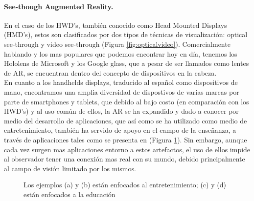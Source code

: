 \documentclass[a4paper,openright,12pt]{report}
\begin{document}
\paragraph{See-though Augmented Reality.}
En el caso de los HWD's, también conocido como Head Mounted Displays (HMD's), estos son clasificados por dos tipos de técnicas de visualización: optical see-through y video see-through (Figura \ref{fig:opticalvideo}). Comercialmente hablando y los mas populares que podemos encontrar hoy en día, tenemos los Hololens de Microsoft y los Google glass, que a pesar de ser llamados como lentes de AR, se encuentran dentro del concepto de dispositivos en la cabeza.\\
En cuanto a los handhelds displays, traducido al español como dispositivos de mano, encontramos una amplia diversidad de dispostivos de varias marcas por parte de smartphones y tablets, que debido al bajo costo (en comparación con los HWD's) y al uso común de ellos, la AR se ha expandido y dado a conocer por medio del desarrollo de aplicaciones, que así como se ha utilizado como medio de entretenimiento, también ha servido de apoyo en el campo de la enseñanza, a través de aplicaciones tales como se presenta en (Figura \ref{fig:ARejemplos}). Sin embargo, aunque cada vez surgen mas aplicaciones entorno a estos artefactos, el uso de ellos impide al observador tener una conexión mas real con su mundo, debido principalmente al campo de visión limitado por los mismos.\\
\begin{figure}[thbp]
	\centering
	\caption[Ejemplos de AR en smartphones y tablets]{Los ejemplos (a) y (b) están enfocados al entretenimiento; (c) y (d) están enfocados a la educación} \label{fig:ARejemplos}
\end{figure}
\end{document}
